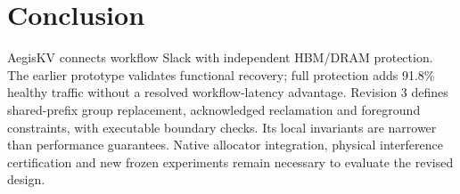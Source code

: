 \section{Conclusion}
AegisKV connects workflow Slack with independent HBM/DRAM protection.
The earlier prototype validates functional recovery; full protection adds
91.8\% healthy traffic without a resolved workflow-latency advantage.
Revision 3 defines shared-prefix group replacement, acknowledged reclamation
and foreground constraints, with executable boundary checks. Its local
invariants are narrower than performance guarantees. Native allocator
integration, physical interference certification and new frozen experiments
remain necessary to evaluate the revised design.
